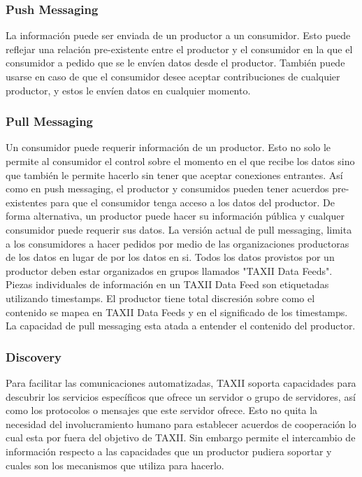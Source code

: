 \subsubsection{Push Messaging}

La información puede ser enviada de un productor a un consumidor. Esto puede 
reflejar una relación pre-existente entre el productor y el consumidor en la que 
el consumidor a pedido que se le envíen datos desde el productor. También puede 
usarse en caso de que el consumidor desee aceptar contribuciones de cualquier 
productor, y estos le envíen datos en cualquier momento.

\subsubsection{Pull Messaging}

Un consumidor puede requerir información de un productor. Esto no solo le 
permite al consumidor el control sobre el momento en el que recibe los datos 
sino que también le permite hacerlo sin tener que aceptar conexiones entrantes. 
Así como en push messaging, el productor y consumidos pueden tener acuerdos 
pre-existentes  para que el consumidor tenga acceso a los datos del productor. 
De forma alternativa, un productor puede hacer su información pública  y 
cualquer consumidor puede requerir sus datos.
La versión actual de pull messaging, limita a los consumidores a hacer pedidos 
por medio de las organizaciones productoras de los datos en lugar de por los 
datos en si. Todos los datos provistos por un productor deben estar organizados 
en grupos llamados "TAXII Data Feeds". Piezas individuales de información en un 
TAXII Data Feed son etiquetadas utilizando timestamps. El productor tiene total 
discresión sobre como el contenido se mapea en TAXII Data Feeds y en el 
significado de los timestamps. La capacidad de pull messaging esta atada a 
entender el contenido del productor.

\subsubsection{Discovery}

Para facilitar las comunicaciones automatizadas, TAXII soporta capacidades para 
descubrir los servicios específicos que ofrece un servidor o grupo de 
servidores, así como los protocolos o mensajes que este servidor ofrece. Esto no 
quita la necesidad del involucramiento humano para establecer acuerdos de 
cooperación lo cual esta por fuera del objetivo de TAXII. Sin embargo permite el 
intercambio de información respecto a las capacidades que un productor pudiera 
soportar y cuales son los mecanismos que utiliza para hacerlo.


